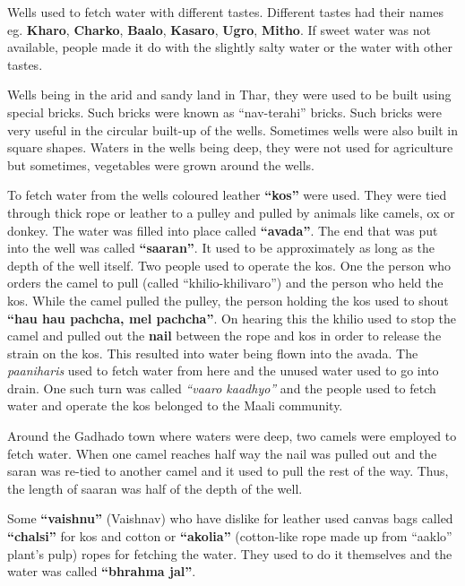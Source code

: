 Wells used to fetch water with different tastes. Different tastes had their
names eg. \textbf{Kharo}, \textbf{Charko}, \textbf{Baalo}, \textbf{Kasaro},
\textbf{Ugro}, \textbf{Mitho}. If sweet water was not available, people made it
do with the slightly salty water or the water with other tastes.

Wells being in the arid and sandy land in Thar, they were used to be built using
special bricks. Such bricks were known as ``nav-terahi'' bricks. Such bricks
were very useful in the circular built-up of the wells. Sometimes wells were
also built in square shapes. Waters in the wells being deep, they were not used
for agriculture but sometimes, vegetables were grown around the wells.

To fetch water from the wells coloured leather \textbf{``kos''} were used. They
were tied through thick rope or leather to a pulley and pulled by animals like
camels, ox or donkey. The water was filled into place called \textbf{``avada''}.
The end that was put into the well was called \textbf{``saaran''}. It used to be
approximately as long as the depth of the well itself. Two people used to
operate the kos. One the person who orders the camel to pull (called
``khilio-khilivaro'') and the person who held the kos. While the camel pulled
the pulley, the person holding the kos used to shout \textbf{``hau hau pachcha,
mel pachcha''}. On hearing this the khilio used to stop the camel and pulled out
the \textbf{nail} between the rope and kos in order to release the strain on the
kos. This resulted into water being flown into the avada. The
\textit{paaniharis} used to fetch water from here and the unused water used to
go into drain. One such turn was called \textit{``vaaro kaadhyo''} and the
people used to fetch water and operate the kos belonged to the Maali community.

Around the Gadhado town where waters were deep, two camels were employed to
fetch water. When one camel reaches half way the nail was pulled out and the
saran was re-tied to another camel and it used to pull the rest of the way.
Thus, the length of saaran was half of the depth of the well.

Some \textbf{``vaishnu''} (Vaishnav) who have dislike for leather used canvas
bags called \textbf{``chalsi''} for kos and cotton or \textbf{``akolia''}
(cotton-like rope made up from ``aaklo'' plant's pulp) ropes for fetching the
water. They used to do it themselves and the water was called \textbf{``bhrahma
jal''}.

